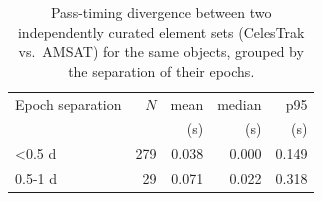 \begin{table}[t]
\caption{Pass-timing divergence between two independently curated element sets (CelesTrak vs.\ AMSAT) for the same objects, grouped by the separation of their epochs.}
\label{tab:elements}
\centering
\begin{tabular}{lrrrr}
\toprule
Epoch separation & $N$ & mean & median & p95 \\
& & (s) & (s) & (s) \\
\midrule
<0.5 d & 279 & 0.038 & 0.000 & 0.149 \\
0.5-1 d & 29 & 0.071 & 0.022 & 0.318 \\
\bottomrule
\end{tabular}
\end{table}
